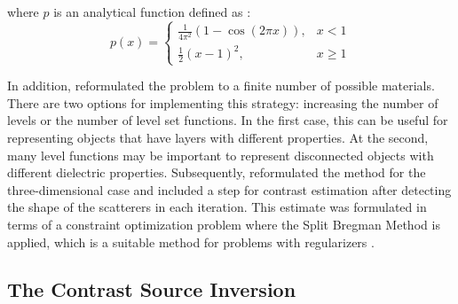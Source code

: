 			\noindent where $p$ is an analytical function defined as \citep{li2010distance}:
			\begin{equation}
				p(x) = \begin{cases}
					          \frac{1}{4\pi^2}\left(1-\cos(2\pi x)\right), &x<1  \\
					          \frac{1}{2}\left(x-1\right)^2, &x\ge 1
				           \end{cases} \label{eq:3:deterministic:levelset:5}
			\end{equation}
		
			In addition, \cite{shah2018fast} reformulated the problem to a finite number of possible materials. There are two options for implementing this strategy: increasing the number of levels or the number of level set functions. In the first case, this can be useful for representing objects that have layers with different properties. At the second, many level functions may be important to represent disconnected objects with different dielectric properties. Subsequently, \cite{shah20193d} reformulated the method for the three-dimensional case and included a step for contrast estimation after detecting the shape of the scatterers in each iteration. This estimate was formulated in terms of a constraint optimization problem where the Split Bregman Method is applied, which is a suitable method for problems with regularizers \citep{xiong2019convex}.

		\subsection{The Contrast Source Inversion}\label{chap:methods:deterministic:csi}
		
